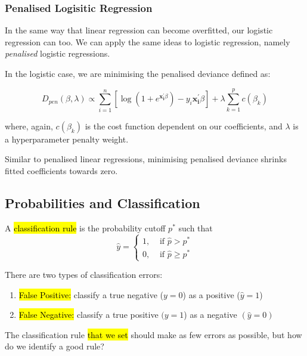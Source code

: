 \documentclass[11pt]{article}
\begin{document}
\subsubsection{Penalised Logisitic Regression}

In the same way that linear regression can become overfitted, our logistic regression can too. We can apply the same ideas to logistic regression, namely \textit{penalised} logistic regressions.

In the logistic case, we are minimising the penalised deviance defined as:

\begin{equation}
    \label{eq:log dev pen}
    D_{pen}(\beta,\lambda) \propto \sum_{i=1}^n\left[\log(1 + e^{\mathbf{x_i^\prime}\beta}) - y_i \mathbf{x_i^\prime}\beta\right] + \lambda \sum_{k=1}^p c(\beta_k)
\end{equation}

where, again, $c(\beta_k)$ is the cost function dependent on our coefficients, and $\lambda$ is a hyperparameter penalty weight. 

\begin{note}
    Similar to penalised linear regressions, minimising penalised deviance shrinks fitted coefficients towards zero.
\end{note}

\subsection{Probabilities and Classification}

A \hl{classification rule} is the probability cutoff $p^*$ such that
\begin{equation*}
    \hat{y} = \begin{cases}
        1, &\text{ if } \hat{p} > p^* \\
        0, &\text{ if } \hat{p} \geq p^*
    \end{cases}
\end{equation*}

There are two types of classification errors:
\begin{enumerate}
    \item \hl{False Positive:} classify a true negative ($y=0$) as a positive ($\hat{y} = 1$)
    \item \hl{False Negative:} classify a true positive $(y = 1$) as a negative $(\hat{y} = 0)$
\end{enumerate}

The classification rule \hl{that we set} should make as few errors as possible, but how do we identify a good rule?
\end{document}
